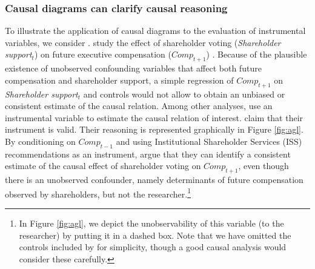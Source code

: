 \documentclass[12pt,reqno,titlepage]{amsart}
\theoremstyle{definition}
\begin{document}
\begin{doublespace}
\subsubsection{Causal diagrams can clarify causal reasoning}
To illustrate the application of causal diagrams to the evaluation of instrumental variables, we consider \citet{Armstrong:2013io}.
%
\citet{Armstrong:2013io} study the effect of shareholder voting (\textit{Shareholder support}$_{t}$) on future executive compensation ($\textit{Comp}_{t+1}$) .
Because of the plausible existence of unobserved confounding variables that affect both future compensation and shareholder support, a simple regression of $\textit{Comp}_{t+1}$ on \textit{Shareholder support}$_{t}$ and controls would not allow \citet{Armstrong:2013io} to obtain an unbiased or consistent estimate of the causal relation.
Among other analyses, \citet{Armstrong:2013io} use an instrumental variable to estimate the causal relation of interest.
\citet{Armstrong:2013io} claim that their instrument is valid. Their reasoning is represented graphically in Figure \ref{fig:agl}.
By conditioning on $\textit{Comp}_{t-1}$ and using Institutional Shareholder Services (ISS) recommendations as an instrument, \citet{Armstrong:2013io} argue that they can identify a consistent estimate of the causal effect of shareholder voting on $\textit{Comp}_{t+1}$, even though there is an unobserved confounder, namely determinants of future compensation observed by shareholders, but not the researcher.\footnote{
In Figure \ref{fig:agl}, we depict the unobservability of this variable (to the researcher) by putting it in a dashed box.
Note that we have omitted the controls included by \citet{Armstrong:2013io} for simplicity, though a good causal analysis would consider these carefully.}


\end{doublespace}
\end{document}
